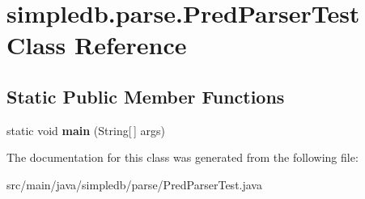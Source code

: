 \hypertarget{classsimpledb_1_1parse_1_1PredParserTest}{}\section{simpledb.\+parse.\+Pred\+Parser\+Test Class Reference}
\label{classsimpledb_1_1parse_1_1PredParserTest}
\subsection*{Static Public Member Functions}
\begin{DoxyCompactItemize}
\item 
\mbox{\label{classsimpledb_1_1parse_1_1PredParserTest_ad2da504a8eeed3202e6acc72f930c31c}} 
static void {\bfseries main} (String\mbox{[}$\,$\mbox{]} args)
\end{DoxyCompactItemize}


The documentation for this class was generated from the following file\+:\begin{DoxyCompactItemize}
\item 
src/main/java/simpledb/parse/Pred\+Parser\+Test.\+java\end{DoxyCompactItemize}
